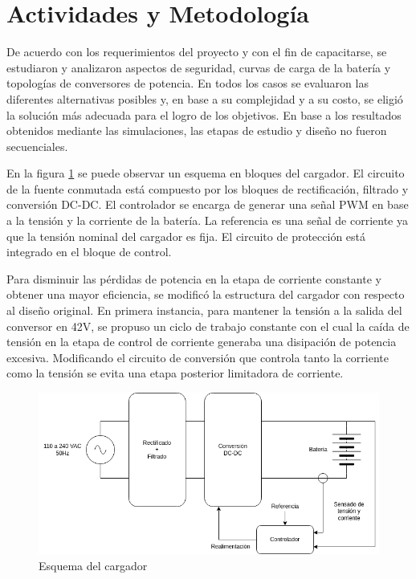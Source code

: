 \section{Actividades y Metodología}

De acuerdo con los requerimientos del proyecto y con el fin de capacitarse, se estudiaron y analizaron aspectos de seguridad, 
curvas de carga de la batería y topologías de conversores de potencia.
En todos los casos se evaluaron las diferentes alternativas posibles y, en base a su complejidad y a su costo,
se eligió la solución más adecuada para el logro de los objetivos. 
En base a los resultados obtenidos mediante las simulaciones, las etapas de estudio y diseño no fueron secuenciales. 

En la figura \ref{fig:esquema_cargador} se puede observar un esquema en bloques del cargador.
El circuito de la fuente conmutada está compuesto por los bloques de rectificación, filtrado y conversión DC-DC.
El controlador se encarga de generar una señal PWM en base a la tensión y la corriente de la batería.
La referencia es una señal de corriente ya que la tensión nominal del cargador es fija.
El circuito de protección está integrado en el bloque de control.

Para disminuir las pérdidas de potencia en la etapa de corriente constante y obtener una mayor eficiencia,
se modificó la estructura del cargador con respecto al diseño original. 
En primera instancia, para mantener la tensión a la salida del conversor en 42V, se propuso un ciclo de trabajo constante 
con el cual la caída de tensión en la etapa de control de corriente generaba una disipación de potencia excesiva.
Modificando el circuito de conversión que controla tanto la corriente como la tensión
se evita una etapa posterior limitadora de corriente.

\begin{figure}
    \centering
    \includegraphics[width=\textwidth]{images/esquema_cargador_v2.png}
    \caption{Esquema del cargador}
    \label{fig:esquema_cargador}
\end{figure}

